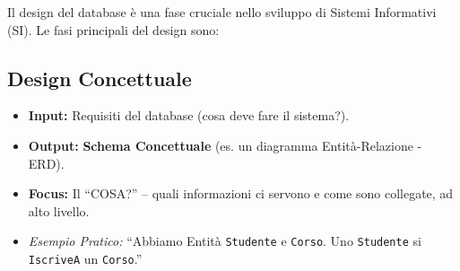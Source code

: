 \documentclass{article}
\begin{document}
	Il design del database è una fase cruciale nello sviluppo di Sistemi Informativi (SI). Le fasi principali del design sono:
	
	\subsection{Design Concettuale}
	\begin{itemize}
		\item \textbf{Input:} Requisiti del database (cosa deve fare il sistema?).
		\item \textbf{Output:} \textbf{Schema Concettuale} (es. un diagramma Entità-Relazione - ERD).
		\item \textbf{Focus:} Il ``COSA?'' – quali informazioni ci servono e come sono collegate, ad alto livello.
		\item \textit{Esempio Pratico:} ``Abbiamo Entità \texttt{Studente} e \texttt{Corso}. Uno \texttt{Studente} si \texttt{IscriveA} un \texttt{Corso}.''
	\end{itemize}
	
		
\end{document}
